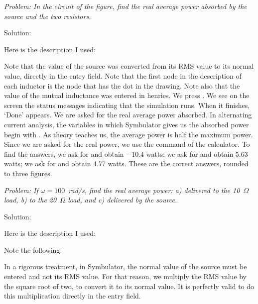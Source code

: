 
\emph{Problem: In the circuit of the figure, find the real average
power absorbed by the source and the two resistors.}

Solution:

Here is the description I used:


Note that the value of the source was converted from its RMS value
to its normal value, directly in the entry field. Note that the
first node in the description of each inductor is the node that has
the dot in the drawing. Note also that the value of the mutual
inductance was entered in henries. We press .
We see on the screen the status messages indicating that the
simulation runs. When it finishes, `Done' appears. We are asked for
the real average power absorbed. In alternating current analysis,
the variables in which Symbulator gives us the absorbed power begin
with . As theory teaches us, the average power is half the
maximum power. Since we are asked for the real power, we use the
 command of the calculator. To find the answers, we ask
for  and obtain $-10.4$ watts; we ask for
 and obtain 5.63 watts; we ask for
 and obtain 4.77 watts. These are the correct
answers, rounded to three figures.


\emph{Problem: If $\omega = 100$~rad/s, find the real average power:
a) delivered to the 10~$\Omega$ load, b) to the 20~$\Omega$ load,
and c) delivered by the source.}

Solution:

Here is the description I used:


Note the following:

In a rigorous treatment, in Symbulator, the normal value of the
source must be entered and not its RMS value. For that reason, we
multiply the RMS value by the square root of two, to convert it to
its normal value. It is perfectly valid to do this multiplication
directly in the entry field.

